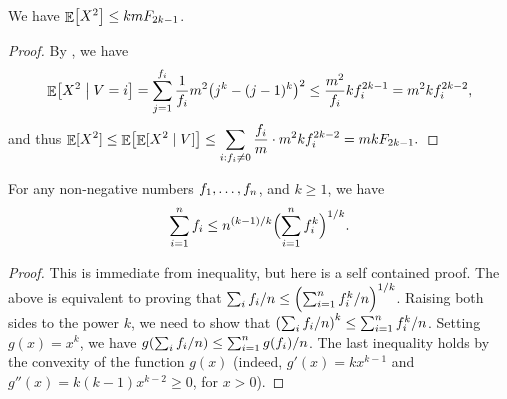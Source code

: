\begin{lemma}
    We have $\mathop{\mathbb{E}}\!\left[ {X^2} \right] \leq k m F_{2k-1}$.
\end{lemma}
\begin{proof}
    By , we have
    \begin{equation*}
        \ExCond{X^2}{V=i} =%
        \sum_{j=1}^{\frq_i}\frac{1}{\frq_i} m^2 \bigl( j^k - (j-1)^k
        \bigr)^2 \leq \frac{m^2}{\frq_i} k \frq_i^{2k-1}%
        =%
        m^2 k \frq_i^{2k-2},
    \end{equation*}
    and thus
    \begin{math}
        \ds%
        \Ex{\smash{X^2}}%
        \leq%
        \Ex{\bigl.\ExCond{\smash{X^2}}{V}\bigr.} %
        \leq%
        \sum_{i: \frq_i\neq 0} \frac{\frq_i}{m}\cdot m^2 k
        \frq_i^{2k-2} = mk \Frq_{2k-1}.
    \end{math}
\end{proof}

\begin{lemma}
    For any non-negative numbers $f_1, \ldots, f_n$, and
    $k \geq 1 $, we have
    \begin{equation*}
        \sum_{i=1}^n f_i \leq n^{(k-1)/k} \Bigl( \sum_{i=1}^n
        f_i^k\Bigr)^{1/k}.
    \end{equation*}
\end{lemma}
\begin{proof}
    This is immediate from \Holder inequality, but here is a self
    contained proof.  The above is equivalent to proving that
    $\sum_i f_i/n \leq \Bigl( \sum_{i=1}^n f_i^k/n \Bigr)^{1/k}
    $.  Raising both sides to the power $k$, we need to show that
    $\pth{\sum_i \frq_i/n}^k \leq \sum_{i=1}^n \frq_i^k/n$. Setting
    $g(x)=x^k$, we have
    $g \pth{\sum_i \frq_i/n} \leq \sum_{i=1}^n g(\frq_i)/n$.  The last
    inequality holds by the convexity of the function $g(x)$ (indeed,
    $g'(x) = kx^{k-1}$ and $g''(x) = k(k-1)x^{k-2} \geq 0$, for
    $x > 0$).
\end{proof}

